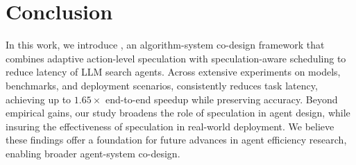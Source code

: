 \section{Conclusion}
In this work, we introduce \system, an algorithm-system co-design framework that combines adaptive action-level speculation with speculation-aware scheduling to reduce latency of LLM search agents.
Across extensive experiments on models, benchmarks, and deployment scenarios, \system consistently reduces task latency, achieving up to $1.65\times$ end-to-end speedup while preserving accuracy.
Beyond empirical gains, our study broadens the role of speculation in agent design, while insuring the effectiveness of speculation in real-world deployment.
We believe these findings offer a foundation for future advances in agent efficiency research, enabling broader agent-system co-design.
